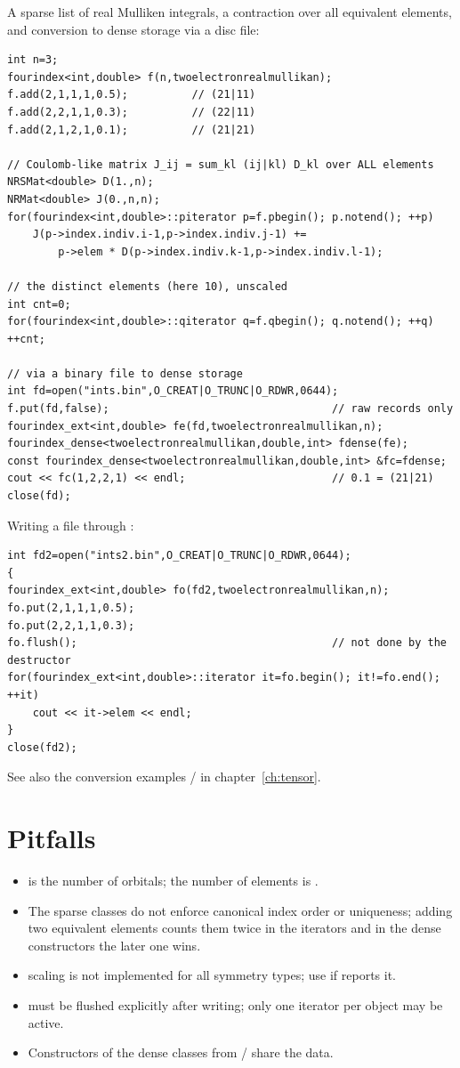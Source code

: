 A sparse list of real Mulliken integrals, a contraction over all equivalent elements, and conversion to
dense storage via a disc file:
\begin{lstlisting}
int n=3;
fourindex<int,double> f(n,twoelectronrealmullikan);
f.add(2,1,1,1,0.5);          // (21|11)
f.add(2,2,1,1,0.3);          // (22|11)
f.add(2,1,2,1,0.1);          // (21|21)

// Coulomb-like matrix J_ij = sum_kl (ij|kl) D_kl over ALL elements
NRSMat<double> D(1.,n);
NRMat<double> J(0.,n,n);
for(fourindex<int,double>::piterator p=f.pbegin(); p.notend(); ++p)
    J(p->index.indiv.i-1,p->index.indiv.j-1) +=
        p->elem * D(p->index.indiv.k-1,p->index.indiv.l-1);

// the distinct elements (here 10), unscaled
int cnt=0;
for(fourindex<int,double>::qiterator q=f.qbegin(); q.notend(); ++q) ++cnt;

// via a binary file to dense storage
int fd=open("ints.bin",O_CREAT|O_TRUNC|O_RDWR,0644);
f.put(fd,false);                                   // raw records only
fourindex_ext<int,double> fe(fd,twoelectronrealmullikan,n);
fourindex_dense<twoelectronrealmullikan,double,int> fdense(fe);
const fourindex_dense<twoelectronrealmullikan,double,int> &fc=fdense;
cout << fc(1,2,2,1) << endl;                       // 0.1 = (21|21)
close(fd);
\end{lstlisting}

Writing a file through :
\begin{lstlisting}
int fd2=open("ints2.bin",O_CREAT|O_TRUNC|O_RDWR,0644);
{
fourindex_ext<int,double> fo(fd2,twoelectronrealmullikan,n);
fo.put(2,1,1,1,0.5);
fo.put(2,2,1,1,0.3);
fo.flush();                                        // not done by the destructor
for(fourindex_ext<int,double>::iterator it=fo.begin(); it!=fo.end(); ++it)
    cout << it->elem << endl;
}
close(fd2);
\end{lstlisting}
See also the conversion examples / in chapter~\ref{ch:tensor}.

\section{Pitfalls}\label{sec:fourindex:pitfalls}
\begin{itemize}
\item {} is the number of orbitals; the number of elements is .
\item The sparse classes do not enforce canonical index order or uniqueness; adding two equivalent elements
	counts them twice in the iterators and in the dense constructors the later one wins.
\item {} scaling is not implemented for all symmetry types; use  if
	 reports it.
\item {} must be flushed explicitly after writing; only one iterator per object may be
	active.
\item Constructors of the dense classes from / share the data.
\end{itemize}
